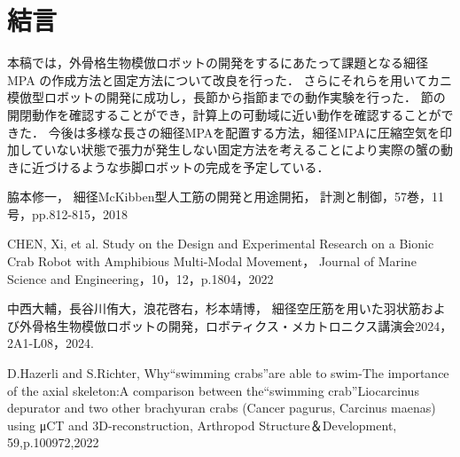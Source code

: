 \documentclass{jarticle}
\begin{document}
\section{結言}
本稿では，外骨格生物模倣ロボットの開発をするにあたって課題となる細径MPA の作成方法と固定方法について改良を行った．
さらにそれらを用いてカニ模倣型ロボットの開発に成功し，長節から指節までの動作実験を行った．
節の開閉動作を確認することができ，計算上の可動域に近い動作を確認することができた．
今後は多様な長さの細径MPAを配置する方法，細径MPAに圧縮空気を印加していない状態で張力が発生しない固定方法を考えることにより実際の蟹の動きに近づけるような歩脚ロボットの完成を予定している．

\begin{thebibliography}{99}
  脇本修一，
  細径McKibben型人工筋の開発と用途開拓，
  計測と制御，57巻，11号，pp.812-815，2018
  
  CHEN, Xi, et al. Study on the Design and Experimental Research on a Bionic Crab Robot with Amphibious Multi-Modal Movement， Journal of Marine Science and Engineering，10，12，p.1804，2022
  
  中西大輔，長谷川侑大，浪花啓右，杉本靖博，
  細径空圧筋を用いた羽状筋および外骨格生物模倣ロボットの開発，ロボティクス・メカトロニクス講演会2024，2A1-L08，2024.

  D.Hazerli and S.Richter,
  Why“swimming crabs”are able to swim-The importance of the axial skeleton:A comparison between the“swimming crab”Liocarcinus depurator and two other brachyuran crabs (Cancer pagurus, Carcinus maenas) using μCT and 3D-reconstruction,
  Arthropod Structure＆Development,
  59,p.100972,2022

 \end{thebibliography}
\end{document}
